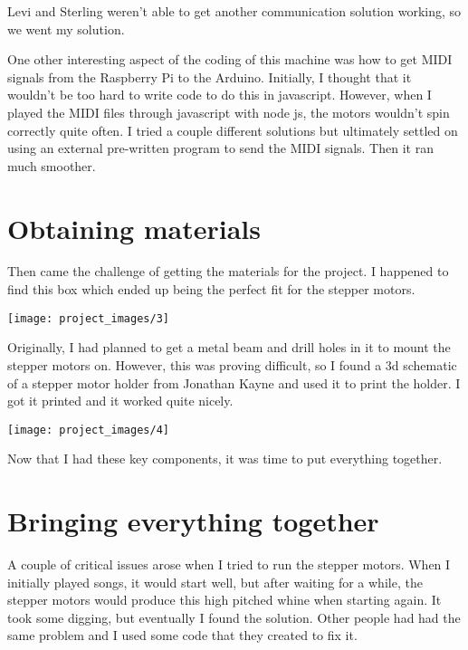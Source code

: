 \documentclass[12pt,letterpaper]{article}
\begin{document}
	Levi and Sterling weren't able to get another communication solution working, so we went my solution. 
	
	One other interesting aspect of the coding of this machine was how to get MIDI signals from the Raspberry Pi to the Arduino. Initially, I thought that it wouldn't be too hard to write code to do this in javascript. However, when I played the MIDI files through javascript with node js, the motors wouldn't spin correctly quite often. I tried a couple different solutions but ultimately settled on using an external pre-written program to send the MIDI signals. Then it ran much smoother. 
	
	\section{Obtaining materials}
	
	Then came the challenge of getting the materials for the project. I happened to find this box which ended up being the perfect fit for the stepper motors. 
	
	\begin{center}
		\texttt{[image: project\_images/3]}
	\end{center}

	Originally, I had planned to get a metal beam and drill holes in it to mount the stepper motors on. However, this was proving difficult, so I found a 3d schematic of a stepper motor holder from Jonathan Kayne and used it to print the holder. I got it printed and it worked quite nicely. 
	
	\begin{center}
		\texttt{[image: project\_images/4]}
	\end{center}

	Now that I had these key components, it was time to put everything together. 
	
	\section{Bringing everything together}
	
	A couple of critical issues arose when I tried to run the stepper motors. When I initially played songs, it would start well, but after waiting for a while, the stepper motors would produce this high pitched whine when starting again. It took some digging, but eventually I found the solution. Other people had had the same problem and I used some code that they created to fix it. 
	
\end{document}
